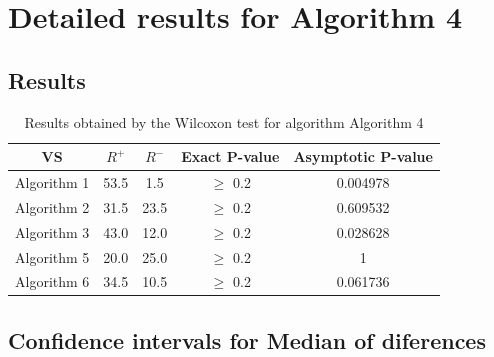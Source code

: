 \documentclass[a4paper,10pt]{article}
\begin{document}
 \clearpage 


\section{Detailed results for Algorithm 4}


\subsection{Results}

\begin{table}[!htp]
\centering\small
\begin{tabular}{
|c|c|c|c|c|}
\hline
 VS & $R^{+}$ & $R^{-}$ & Exact P-value & Asymptotic P-value \\ \hline 
Algorithm 1 & 53.5 & 1.5 & $\geq$ 0.2 & 0.004978\\ \hline 
Algorithm 2 & 31.5 & 23.5 & $\geq$ 0.2 & 0.609532\\ \hline 
Algorithm 3 & 43.0 & 12.0 & $\geq$ 0.2 & 0.028628\\ \hline 
Algorithm 5 & 20.0 & 25.0 & $\geq$ 0.2 & 1\\ \hline 
Algorithm 6 & 34.5 & 10.5 & $\geq$ 0.2 & 0.061736\\ \hline 

\end{tabular}
\caption{Results obtained by the Wilcoxon test for algorithm Algorithm 4}
\end{table}

\subsection{Confidence intervals for Median of diferences}
\end{document}
